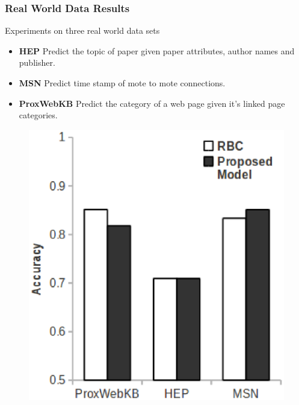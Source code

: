 \documentclass[10pt, blue,subsection=true, compress]{beamer}
\begin{document}
\begin{frame}\frametitle{Real World Data Results}
\begin{block}{Experiments on three real world data sets}
\begin{itemize}
\item \textbf{HEP}
Predict the topic of paper given paper attributes, author names and
 publisher. 
 \item \textbf{MSN} Predict time stamp of mote to mote connections. 
 \item \textbf{ProxWebKB} Predict the category of a web page given it's linked page categories.
\end{itemize}
\end{block}
\begin{figure}[htbp]
\centering
\includegraphics[scale=0.3]{img/model-acc.eps}
\end{figure}
\end{frame}
\end{document}
